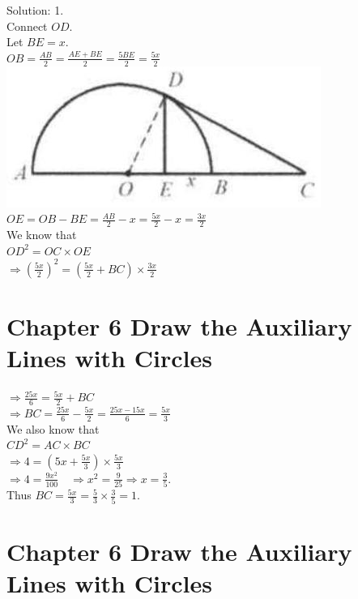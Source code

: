 \documentclass[10pt]{article}
\begin{document}
Solution: 1.\\
Connect \(O D\).\\
Let \(B E=x\).\\
\(O B=\frac{A B}{2}=\frac{A E+B E}{2}=\frac{5 B E}{2}=\frac{5 x}{2}\)\\
\includegraphics[max width=\textwidth, center]{2025_04_17_97bc1f7e44d93c271a88g-152(1)}\\
\(O E=O B-B E=\frac{A B}{2}-x=\frac{5 x}{2}-x=\frac{3 x}{2}\)\\
We know that\\
\(O D^{2}=O C \times O E\)\\
\(\Rightarrow\left(\frac{5 x}{2}\right)^{2}=\left(\frac{5 x}{2}+B C\right) \times \frac{3 x}{2}\)

\section*{Chapter 6 Draw the Auxiliary Lines with Circles}
\(\Rightarrow \frac{25 x}{6}=\frac{5 x}{2}+B C\)\\
\(\Rightarrow B C=\frac{25 x}{6}-\frac{5 x}{2}=\frac{25 x-15 x}{6}=\frac{5 x}{3}\)\\
We also know that\\
\(C D^{2}=A C \times B C\)\\
\(\Rightarrow 4=\left(5 x+\frac{5 x}{3}\right) \times \frac{5 x}{3}\)\\
\(\Rightarrow 4=\frac{9 x^{2}}{100} \quad \Rightarrow x^{2}=\frac{9}{25} \Rightarrow x=\frac{3}{5}\).\\
Thus \(B C=\frac{5 x}{3}=\frac{5}{3} \times \frac{3}{5}=1\).

\section*{Chapter 6 Draw the Auxiliary Lines with Circles}
\end{document}
